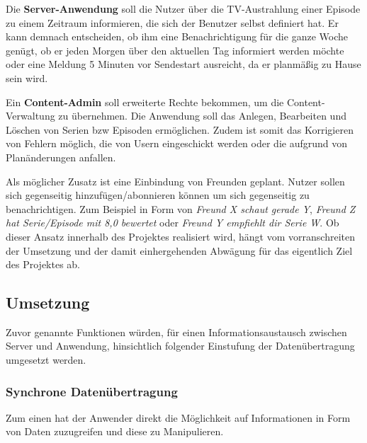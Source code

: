 \newpage
Die \textbf{Server-Anwendung} soll die Nutzer über die TV-Austrahlung einer Episode zu einem Zeitraum informieren, die sich der Benutzer selbst definiert hat. Er kann demnach entscheiden, ob ihm eine Benachrichtigung für die ganze Woche genügt, ob er jeden Morgen über den aktuellen Tag informiert werden möchte oder eine Meldung 5 Minuten vor Sendestart ausreicht, da er planmäßig zu Hause sein wird.

\parskip 12pt
\parindent 0pt
Ein \textbf{Content-Admin} soll erweiterte Rechte bekommen, um die Content-Verwaltung zu übernehmen. Die Anwendung soll das Anlegen, Bearbeiten und Löschen von Serien bzw Episoden ermöglichen. Zudem ist somit das Korrigieren von Fehlern möglich, die von Usern eingeschickt werden oder die aufgrund von Planänderungen anfallen.

Als möglicher Zusatz ist eine Einbindung von Freunden geplant. Nutzer sollen sich gegenseitig hinzufügen/abonnieren können um sich gegenseitig zu benachrichtigen. Zum Beispiel in Form von \textit{Freund X schaut gerade Y}, \textit{Freund Z hat Serie/Episode mit 8,0 bewertet} oder \textit{Freund Y empfiehlt dir Serie W}. Ob dieser Ansatz innerhalb des Projektes realisiert wird, hängt vom vorranschreiten der Umsetzung  und der damit einhergehenden Abwägung für das eigentlich Ziel des Projektes ab.
\subsection{Umsetzung}
Zuvor genannte Funktionen würden, für einen Informationsaustausch zwischen Server und Anwendung, hinsichtlich folgender Einstufung der Datenübertragung umgesetzt werden.

\subsubsection{Synchrone Datenübertragung}

Zum einen hat der Anwender direkt die Möglichkeit auf Informationen in Form von Daten zuzugreifen und diese zu Manipulieren.

